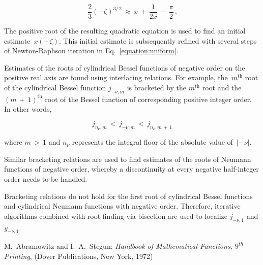 \documentclass{article}[10pt]
\begin{document}
\begin{equation}
\dfrac{2}{3}
(-\zeta)^{3/\,2}
\,\approx\,
x
\,+\,
\dfrac{1}{2x}
\,-\,
\dfrac{\pi}{2}\,
{\text{.}}
\end{equation}

\noindent
The positive root of the resulting quadratic equation
is used to find an initial estimate~$x(-\zeta)$.
This initial estimate is subsequently refined with
several steps of Newton-Raphson iteration
in Eq.~\ref{equation:uniform}.

Estimates of the roots of cylindrical Bessel functions
of negative order on the positive real axis are found
using interlacing relations. For example, the~$m^{\text{th}}$
root of the cylindrical Bessel function $j_{-\nu,m}$
is bracketed by the $m^{\text{th}}$ root and the
$(m\,+\,1)^{\text{th}}$ root of the Bessel function of
corresponding positive integer order. In other words,

\begin{equation}
j_{n_{\nu},m}
\,<\,
j_{-\nu,m}
\,<\,
j_{n_{\nu},m\,+\,1}
\end{equation}

\noindent
where $m\,>\,1$ and $n_{\nu}$ represents the integral
floor of the absolute value of~$\left|-\nu\right|$.

Similar bracketing relations are used to find estimates
of the roots of Neumann functions of negative order,
whereby a discontinuity at every negative half-integer
order needs to be handled.

Bracketing relations do not hold for the first root
of cylindrical Bessel functions and cylindrical Neumann
functions with negative order. Therefore, iterative algorithms
combined with root-finding via bisection are used
to localize $j_{-\nu,1}$ and $y_{-\nu,1}$.

\begin{thebibliography}{9}

M.~Abramowitz and I.~A.~Stegun:
{\textit{Handbook of Mathematical Functions, $9^{th}$ Printing}},
(Dover Publications, New York, 1972)

\end{thebibliography}
\end{document}
